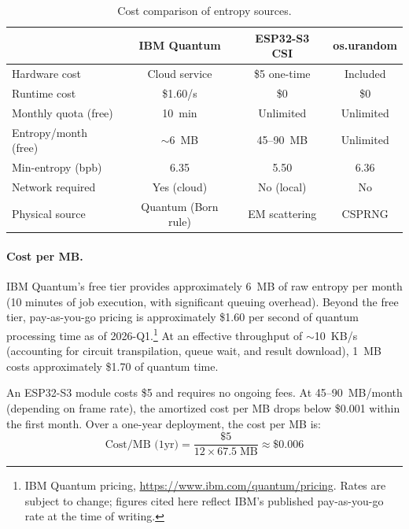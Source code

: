 \begin{table}[t]
\centering
\caption{Cost comparison of entropy sources.}
\label{tab:economics}
\small
\begin{tabular}{@{}lccc@{}}
\toprule
& \textbf{IBM Quantum} & \textbf{ESP32-S3 CSI} & \textbf{os.urandom} \\
\midrule
Hardware cost & Cloud service & \$5 one-time & Included \\
Runtime cost & \$1.60/s & \$0 & \$0 \\
Monthly quota (free) & 10~min & Unlimited & Unlimited \\
Entropy/month (free) & $\sim$6~MB\footnotemark & 45--90~MB & Unlimited \\
Min-entropy (bpb) & 6.35 & 5.50 & 6.36 \\
Network required & Yes (cloud) & No (local) & No \\
Physical source & Quantum (Born rule) & EM scattering & CSPRNG \\
\bottomrule
\end{tabular}
\end{table}

\paragraph{Cost per MB.}
IBM Quantum's free tier provides approximately 6~MB of raw entropy per month (10 minutes of job execution, with significant queuing overhead).
Beyond the free tier, pay-as-you-go pricing is approximately \$1.60 per second of quantum processing time as of 2026-Q1.\footnote{IBM Quantum pricing, \url{https://www.ibm.com/quantum/pricing}. Rates are subject to change; figures cited here reflect IBM's published pay-as-you-go rate at the time of writing.}
At an effective throughput of $\sim$10~KB/s (accounting for circuit transpilation, queue wait, and result download), 1~MB costs approximately \$1.70 of quantum time.

An ESP32-S3 module costs \$5 and requires no ongoing fees.
At 45--90~MB/month (depending on frame rate), the amortized cost per MB drops below \$0.001 within the first month.
Over a one-year deployment, the cost per MB is:
\begin{equation}
\text{Cost/MB (1yr)} = \frac{\$5}{12 \times 67.5 \; \text{MB}} \approx \$0.006
\label{eq:cost-per-mb}
\end{equation}

